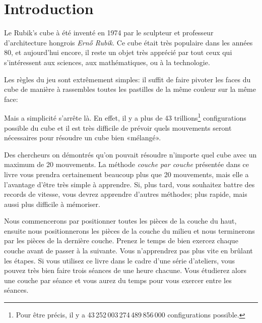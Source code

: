 \chapter{Introduction}

Le Rubik's cube à été inventé en 1974 par le sculpteur et professeur d'architecture hongrois \emph{Ernő Rubik}. Ce cube était très populaire
dans les années 80, et aujourd'hui encore, il reste un objet très apprécié
par tout ceux qui s'intéressent aux sciences, aux mathématiques, ou à la technologie.

Les règles du jeu sont extrêmement simples: il suffit de faire pivoter les faces du cube de manière à rassembles toutes les pastilles de la même couleur sur la même face:

\begin{center}
	\RubikCubeSolved
\end{center}


Mais a simplicité s'arrête là. En effet, il y a plus de 43 trillions\footnote{Pour être précis, il y a 43\,252\,003\,274\,489\,856\,000 configurations possible.} configurations possible du cube et il est très difficile de prévoir quels mouvements seront nécessaires pour résoudre un cube bien «mélangé».

Des chercheurs on démontrés\cite{god20} qu'on pouvait résoudre n'importe quel cube avec un maximum de 20 mouvements. La méthode \emph{couche par couche} présentée dans ce livre vous prendra certainement beaucoup plus que 20 mouvements, mais elle a l'avantage d'être très simple à apprendre. Si, plus
tard, vous souhaitez battre des records de vitesse, vous devrez apprendre
d'autres méthodes; plus rapide, mais aussi plus difficile à mémoriser.
 
Nous commencerons par positionner toutes les pièces de la couche du haut, ensuite nous positionnerons les pièces de la couche du milieu et nous terminerons par les pièces de la dernière
couche. Prenez le temps de bien exercez chaque couche avant de passer
à la suivante. Vous n'apprendrez pas plus vite en brûlant les étapes. Si vous utilisez ce livre dans le cadre d'une série d'ateliers, vous pouvez très bien faire trois
séances de une heure chacune. Vous étudierez alors une couche par séance et vous aurez du temps pour vous exercer entre les séances. 
